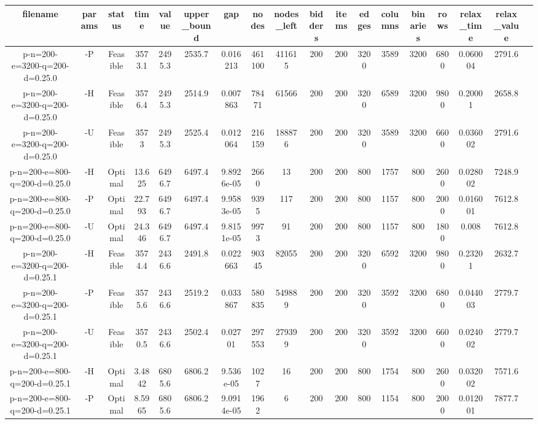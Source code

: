\documentclass[landscape, a4paper]{article}
\begin{document}
\tiny

\begin{center}
\begin{tabular}{@{}cccccccccccccccccc@{}}
filename & params & status & time & value & upper\_bound & gap & nodes & nodes\_left & bidders & items & edges & columns & binaries & rows & relax\_time & relax\_value & \\
\hline
p-n=200-e=3200-q=200-d=0.25.0 & -P & Feasible & 3573.1 & 2495.3 & 2535.7 & 0.016213 & 461100 & 411615 & 200 & 200 & 3200 & 3589 & 3200 & 6800 & 0.060004 & 2791.6 & \\
p-n=200-e=3200-q=200-d=0.25.0 & -H & Feasible & 3576.4 & 2495.3 & 2514.9 & 0.007863 & 78471 & 61566 & 200 & 200 & 3200 & 6589 & 3200 & 9800 & 0.20001 & 2658.8 & \\
p-n=200-e=3200-q=200-d=0.25.0 & -U & Feasible & 3573 & 2495.3 & 2525.4 & 0.012064 & 216159 & 188876 & 200 & 200 & 3200 & 3589 & 3200 & 6600 & 0.036002 & 2791.6 & \\
p-n=200-e=800-q=200-d=0.25.0 & -H & Optimal & 13.625 & 6496.7 & 6497.4 & 9.8926e-05 & 2660 & 13 & 200 & 200 & 800 & 1757 & 800 & 2600 & 0.028002 & 7248.9 & \\
p-n=200-e=800-q=200-d=0.25.0 & -P & Optimal & 22.793 & 6496.7 & 6497.4 & 9.9583e-05 & 9395 & 117 & 200 & 200 & 800 & 1157 & 800 & 2000 & 0.016001 & 7612.8 & \\
p-n=200-e=800-q=200-d=0.25.0 & -U & Optimal & 24.346 & 6496.7 & 6497.4 & 9.8151e-05 & 9973 & 91 & 200 & 200 & 800 & 1157 & 800 & 1800 & 0.008 & 7612.8 & \\
p-n=200-e=3200-q=200-d=0.25.1 & -H & Feasible & 3574.4 & 2436.6 & 2491.8 & 0.022663 & 90345 & 82055 & 200 & 200 & 3200 & 6592 & 3200 & 9800 & 0.23201 & 2632.7 & \\
p-n=200-e=3200-q=200-d=0.25.1 & -P & Feasible & 3575.6 & 2436.6 & 2519.2 & 0.033867 & 580835 & 549889 & 200 & 200 & 3200 & 3592 & 3200 & 6800 & 0.044003 & 2779.7 & \\
p-n=200-e=3200-q=200-d=0.25.1 & -U & Feasible & 3570.5 & 2436.6 & 2502.4 & 0.02701 & 297553 & 279399 & 200 & 200 & 3200 & 3592 & 3200 & 6600 & 0.024002 & 2779.7 & \\
p-n=200-e=800-q=200-d=0.25.1 & -H & Optimal & 3.4842 & 6805.6 & 6806.2 & 9.536e-05 & 1027 & 16 & 200 & 200 & 800 & 1754 & 800 & 2600 & 0.032002 & 7571.6 & \\
p-n=200-e=800-q=200-d=0.25.1 & -P & Optimal & 8.5965 & 6805.6 & 6806.2 & 9.0914e-05 & 1962 & 6 & 200 & 200 & 800 & 1154 & 800 & 2000 & 0.012001 & 7877.7 & \\

\end{tabular}
\end{center}
\end{document}
